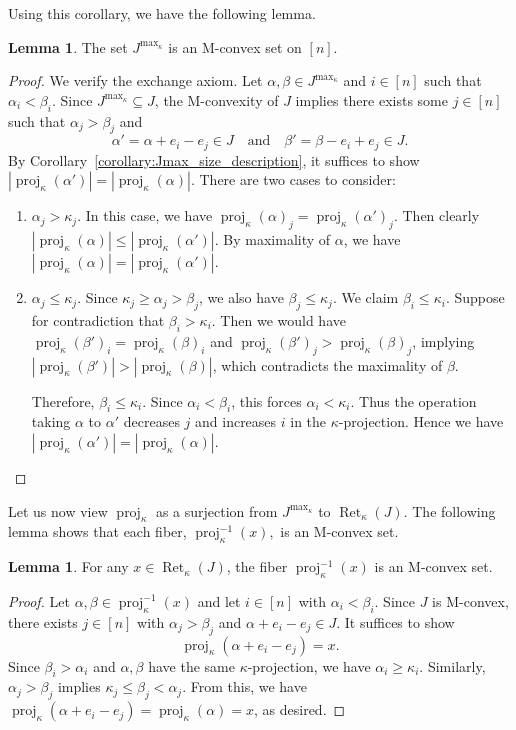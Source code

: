 \documentclass[11pt]{article}
\theoremstyle{definition}
\newtheorem{lemma}[theorem]{Lemma}
\theoremstyle{remark}
\DeclareMathOperator{\proj}{proj}              %
\newcommand{\kproj}{\proj_{\kappa}}            %
\DeclareMathOperator{\Ret}{Ret}                %
\newcommand{\RetK}{\Ret_{\kappa}}              %
\newcommand{\Jmax}{J^{\max_{\kappa}}}
\begin{document}
Using this corollary, we have the following lemma.
\begin{lemma} \label{lemma:Jmax_is_Mconvex}
    The set $\Jmax$ is an M-convex set on $[n]$.
\end{lemma}
\begin{proof}
    We verify the exchange axiom. Let $\alpha,\beta \in \Jmax$ and $i \in [n]$ such that $\alpha_i < \beta_i$. Since $\Jmax \subseteq J$, the M-convexity of $J$ implies there exists some $j \in [n]$ such that $\alpha_j > \beta_j$ and \[
    \alpha' = \alpha +e_i -e_j \in J \quad \text{and}\quad \beta' = \beta - e_i +e_j \in J.
    \]
    By Corollary~\ref{corollary:Jmax_size_description}, it suffices to show $|\kproj(\alpha')| = |\kproj(\alpha)|$. There are two cases to consider:
    \begin{enumerate}[label=\textit{Case \arabic*:}, leftmargin=*, align=left]
        \item $\alpha_j > \kappa_j$. In this case, we have $\kproj(\alpha)_j = \kproj(\alpha')_j$. Then clearly $|\kproj(\alpha)| \leq |\kproj(\alpha')|$. By maximality of $\alpha$, we have $|\kproj(\alpha)| = |\kproj(\alpha')|$.
        \item $\alpha_j \leq \kappa_j$. Since $\kappa_j \geq \alpha_j > \beta_j$, we also have $\beta_j \leq \kappa_j$. We claim $\beta_i \leq \kappa_i$. Suppose for contradiction that $\beta_i > \kappa_i$. Then we would have $\kproj(\beta')_i = \kproj(\beta)_i$ and $\kproj(\beta')_j > \kproj(\beta)_j$, implying $|\kproj(\beta')| > |\kproj(\beta)|$, which contradicts the maximality of $\beta$.
        
        Therefore, $\beta_i \leq \kappa_i$. Since $\alpha_i < \beta_i$, this forces $\alpha_i < \kappa_i$. Thus the operation taking $\alpha$ to $\alpha'$ decreases $j$ and increases $i$ in the $\kappa$-projection. Hence we have $|\kproj(\alpha')| = |\kproj(\alpha)|$.
    \end{enumerate}
\end{proof}
Let us now view $\kproj$ as a surjection from $\Jmax$ to $\RetK(J)$. The following lemma shows that each fiber, $\kproj^{-1}(x),$ is an M-convex set.
\begin{lemma}\label{lemma:fibers_Mconvex}
    For any $x \in \RetK(J)$, the fiber $\kproj^{-1}(x)$ is an M-convex set.
\end{lemma}
\begin{proof}
    Let $\alpha,\beta \in \kproj^{-1}(x)$ and let $i \in [n]$ with $\alpha_i < \beta_i$. Since $J$ is M-convex, there exists $j \in [n]$ with $\alpha_j > \beta_j$ and $\alpha+e_i -e_j \in J$. It suffices to show \[
    \kproj(\alpha +e_i -e_j) = x.
    \]
    Since $\beta_i > \alpha_i$ and $\alpha,\beta$ have the same $\kappa$-projection, we have $\alpha_i \geq \kappa_i$. Similarly, $\alpha_j > \beta_j$ implies $\kappa_j \leq \beta_j < \alpha_j$. From this, we have $\kproj(\alpha + e_i -e_j) = \kproj(\alpha) = x$, as desired.
\end{proof}
\end{document}
